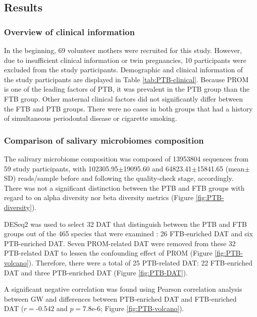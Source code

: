 \documentclass[11pt, a4paper, onecolumn, oneside]{report}
\begin{document}
        \subsection{Results}
            \subsubsection{Overview of clinical information}
                In the beginning, 69 volunteer mothers were recruited for this study. However, due to insufficient clinical information or twin pregnancies, 10 participants were excluded from the study participants. Demographic and clinical information of the study participants are displayed in Table \ref{tab:PTB-clinical}. Because PROM is one of the leading factors of PTB, it was prevalent in the PTB group than the FTB group. Other maternal clinical factors did not significantly differ between the FTB and PTB groups. There were no cases in both groups that had a history of simultaneous periodontal disease or cigarette smoking.

            \subsubsection{Comparison of salivary microbiomes composition}
                The salivary microbiome composition was composed of 13953804 sequences from 59 study participants, with 102305.95$\pm$19095.60 and 64823.41$\pm$15841.65 (mean$\pm$SD) reads/sample before and following the quality-check stage, accordingly. There was not a significant distinction between the PTB and FTB groups with regard to on alpha diversity nor beta diversity metrics (Figure \ref{fig:PTB-diversity}).

                DESeq2 was used to select 32 DAT that distinguish between the PTB and FTB groups out of the 465 species that were examined \cite{DESeq2-1}: 26 FTB-enriched DAT and six PTB-enriched DAT. Seven PROM-related DAT were removed from these 32 PTB-related DAT to lessen the confounding effect of PROM (Figure \ref{fig:PTB-volcano}). Therefore, there were a total of 25 PTB-related DAT: 22 FTB-enriched DAT and three PTB-enriched DAT (Figure \ref{fig:PTB-DAT}).

                A significant negative correlation was found using Pearson correlation analysis between GW and differences between PTB-enriched DAT and FTB-enriched DAT ($r = \textrm{-}0.542$ and $p = 7.8\textrm{e-}6$; Figure \ref{fig:PTB-volcano}).
\end{document}
